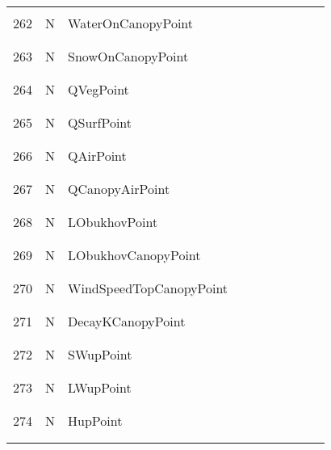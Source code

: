 \begin{longtable}{|c|c|l|c|c|c|c|p{}|c|p{}|}
&&&&&&&&&\\\hline%
&&&&&&&&&\\
262 & N & WaterOnCanopyPoint & & & & & & & \\
&&&&&&&&&\\\hline%
&&&&&&&&&\\
263 & N & SnowOnCanopyPoint & & & & & & & \\
&&&&&&&&&\\\hline%
&&&&&&&&&\\
264 & N & QVegPoint & & & & & & & \\
&&&&&&&&&\\\hline%
&&&&&&&&&\\
265 & N & QSurfPoint & & & & & & & \\
&&&&&&&&&\\\hline%
&&&&&&&&&\\
266 & N & QAirPoint & & & & & & & \\
&&&&&&&&&\\\hline%
&&&&&&&&&\\
267 & N & QCanopyAirPoint & & & & & & & \\
&&&&&&&&&\\\hline%
&&&&&&&&&\\
268 & N & LObukhovPoint & & & & & & & \\
&&&&&&&&&\\\hline%
&&&&&&&&&\\
269 & N & LObukhovCanopyPoint & & & & & & & \\
&&&&&&&&&\\\hline%
&&&&&&&&&\\
270 & N & WindSpeedTopCanopyPoint & & & & & & & \\
&&&&&&&&&\\\hline%
&&&&&&&&&\\
271 & N & DecayKCanopyPoint & & & & & & & \\
&&&&&&&&&\\\hline%
&&&&&&&&&\\
272 & N & SWupPoint & & & & & & & \\
&&&&&&&&&\\\hline%
&&&&&&&&&\\
273 & N & LWupPoint & & & & & & & \\
&&&&&&&&&\\\hline%
&&&&&&&&&\\
274 & N & HupPoint & & & & & & & \\
&&&&&&&&&\\\hline%
&&&&&&&&&\\

\end{longtable}
